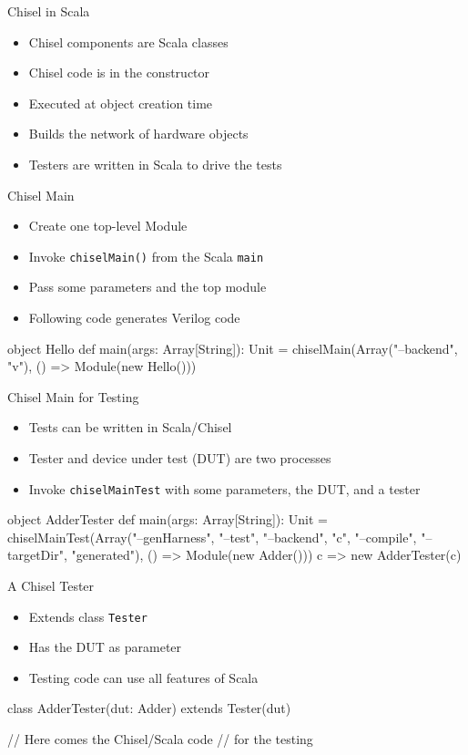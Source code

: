 \documentclass[xcolor=pdflatex,dvipsnames,table]{beamer}
\newcommand{\code}[1]{{\texttt{#1}}}
\begin{document}
\begin{frame}[fragile]{Chisel in Scala}
\begin{itemize}
\item Chisel components are Scala classes
\item Chisel code is in the constructor
\item Executed at object creation time
\item Builds the network of hardware objects
\item Testers are written in Scala to drive the tests
\end{itemize}
\end{frame}

\begin{frame}[fragile]{Chisel Main}

\begin{itemize}
\item Create one top-level Module
\item Invoke \code{chiselMain()} from the Scala \code{main}
\item Pass some parameters and the top module
\item Following code generates Verilog code
\end{itemize}
\begin{chisel}
object Hello {
  def main(args: Array[String]): Unit = {
    chiselMain(Array("--backend", "v"),
      () => Module(new Hello()))
  }
}
\end{chisel}
\end{frame}

\begin{frame}[fragile]{Chisel Main for Testing}
\begin{itemize}
\item Tests can be written in Scala/Chisel
\item Tester and device under test (DUT) are two processes
\item Invoke \code{chiselMainTest} with some parameters, the DUT, and a tester
\end{itemize}
\begin{chisel}
object AdderTester {
  def main(args: Array[String]): Unit = {
    chiselMainTest(Array("--genHarness", "--test",
      "--backend", "c",
      "--compile", "--targetDir", "generated"),
      () => Module(new Adder())) {
        c => new AdderTester(c)
      }
  }
}
\end{chisel}
\end{frame}

\begin{frame}[fragile]{A Chisel Tester}
\begin{itemize}
\item Extends class \code{Tester}
\item Has the DUT as parameter
\item Testing code can use all features of Scala
\end{itemize}
\begin{chisel}
class AdderTester(dut: Adder) extends Tester(dut) {

  // Here comes the Chisel/Scala code
  // for the testing
}
\end{chisel}
\end{frame}
\end{document}
